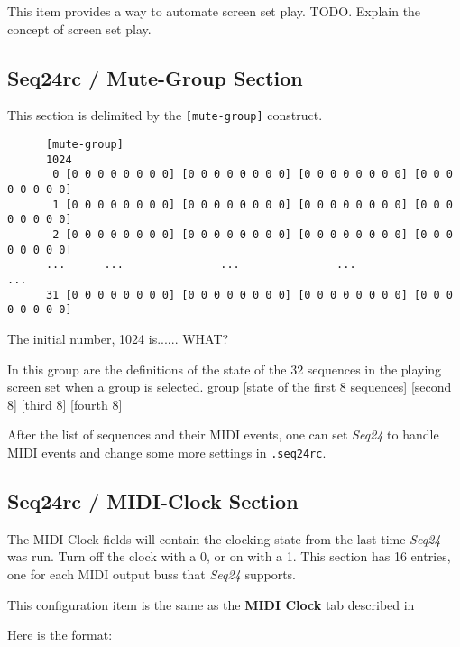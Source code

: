    This item provides a way to automate screen set play.
   TODO.
   Explain the concept of screen set play.

\subsection{Seq24rc / Mute-Group Section}
\label{subsec:seq24_rc_file_mute_group}
     
   This section is delimited by the \texttt{[mute-group]} construct.

   \begin{verbatim}
      [mute-group]
      1024
       0 [0 0 0 0 0 0 0 0] [0 0 0 0 0 0 0 0] [0 0 0 0 0 0 0 0] [0 0 0 0 0 0 0 0]
       1 [0 0 0 0 0 0 0 0] [0 0 0 0 0 0 0 0] [0 0 0 0 0 0 0 0] [0 0 0 0 0 0 0 0]
       2 [0 0 0 0 0 0 0 0] [0 0 0 0 0 0 0 0] [0 0 0 0 0 0 0 0] [0 0 0 0 0 0 0 0]
      ...      ...               ...               ...               ...
      31 [0 0 0 0 0 0 0 0] [0 0 0 0 0 0 0 0] [0 0 0 0 0 0 0 0] [0 0 0 0 0 0 0 0]
   \end{verbatim}

   The initial number, 1024 is...... WHAT?

   In this group are the definitions of the state of the 32 sequences
   in the playing screen set when a group is selected.
   group [state of the first 8 sequences] [second 8] [third 8] [fourth 8]

   After the list of sequences and their MIDI events, one can 
   set \textsl{Seq24} to handle MIDI events and change some more settings
   in \texttt{.seq24rc}.

\subsection{Seq24rc / MIDI-Clock Section}
\label{subsec:seq24_rc_file_midi_clock}

   The MIDI Clock fields will contain the clocking state from the last 
   time \textsl{Seq24} was run.  Turn off the clock with a 0, or on with a 1.
   This section has 16 entries, one for each MIDI output buss that
   \textsl{Seq24} supports.

   This configuration item is the same as the 
   \textbf{MIDI Clock} tab described in
   
   Here is the format:

